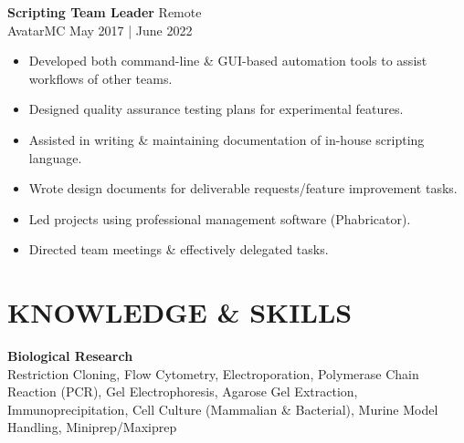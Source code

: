 \documentclass[a4paper,9pt]{extarticle}
\begin{document}

\noindent\textbf{Scripting Team Leader} \hfill Remote \\ 
AvatarMC \hfill May 2017 | June 2022 
\begin{itemize}
    \item Developed both command-line \& GUI-based automation tools to assist workflows of other teams.
    \item Designed quality assurance testing plans for experimental features.
    \item Assisted in writing \& maintaining documentation of in-house scripting language.
    \item Wrote design documents for deliverable requests/feature improvement tasks.
    \item Led projects using professional management software (Phabricator).
    \item Directed team meetings \& effectively delegated tasks.
\end{itemize}



\pagebreak

\section*{KNOWLEDGE \& SKILLS}


\begin{center}\hspace{2em}
\textbf{Biological Research} \\ \vspace{1.5ex}
Restriction Cloning, Flow Cytometry, Electroporation, Polymerase Chain Reaction (PCR), Gel Electrophoresis, Agarose Gel Extraction, Immunoprecipitation, Cell Culture (Mammalian \& Bacterial), Murine Model Handling, Miniprep/Maxiprep
\hspace{2em}
\end{center}
\bigskip
\end{document}
